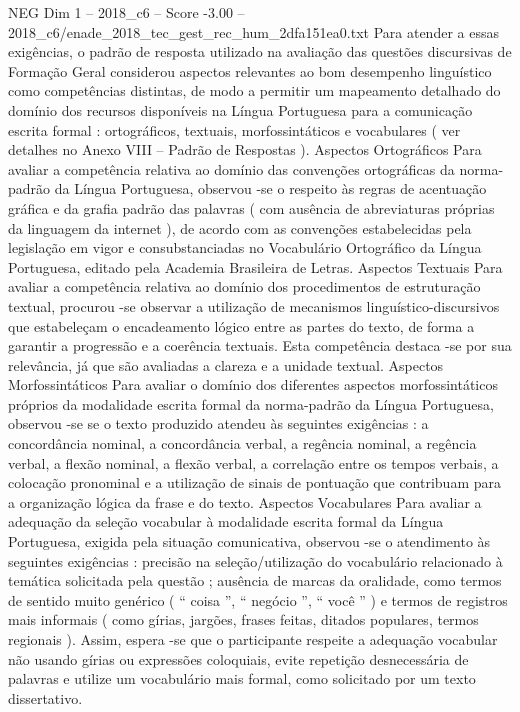 \begin{textsample}{NEG Dim 1 – 2018\_c6 – Score -3.00 – 2018\_c6/enade\_2018\_tec\_gest\_rec\_hum\_2dfa151ea0.txt}
Para atender a essas exigências, o padrão de resposta utilizado na avaliação das questões discursivas de Formação Geral considerou aspectos relevantes ao bom desempenho linguístico como competências distintas, de modo a permitir um mapeamento detalhado do domínio dos recursos disponíveis na Língua Portuguesa para a comunicação escrita formal : ortográficos, textuais, morfossintáticos e vocabulares ( ver detalhes no Anexo VIII – Padrão de Respostas ).
Aspectos Ortográficos Para avaliar a competência relativa ao domínio das convenções ortográficas da norma-padrão da Língua Portuguesa, observou -se o respeito às regras de acentuação gráfica e da grafia padrão das palavras ( com ausência de abreviaturas próprias da linguagem da internet ), de acordo com as convenções estabelecidas pela legislação em vigor e consubstanciadas no Vocabulário Ortográfico da Língua Portuguesa, editado pela Academia Brasileira de Letras.
Aspectos Textuais Para avaliar a competência relativa ao domínio dos procedimentos de estruturação textual, procurou -se observar a utilização de mecanismos linguístico-discursivos que estabeleçam o encadeamento lógico entre as partes do texto, de forma a garantir a progressão e a coerência textuais.
Esta competência destaca -se por sua relevância, já que são avaliadas a clareza e a unidade textual.
Aspectos Morfossintáticos Para avaliar o domínio dos diferentes aspectos morfossintáticos próprios da modalidade escrita formal da norma-padrão da Língua Portuguesa, observou -se se o texto produzido atendeu às seguintes exigências : a concordância nominal, a concordância verbal, a regência nominal, a regência verbal, a flexão nominal, a flexão verbal, a correlação entre os tempos verbais, a colocação pronominal e a utilização de sinais de pontuação que contribuam para a organização lógica da frase e do texto.
Aspectos Vocabulares Para avaliar a adequação da seleção vocabular à modalidade escrita formal da Língua Portuguesa, exigida pela situação comunicativa, observou -se o atendimento às seguintes exigências : precisão na seleção/utilização do vocabulário relacionado à temática solicitada pela questão ; ausência de marcas da oralidade, como termos de sentido muito genérico ( “ coisa ”, “ negócio ”, “ você ” ) e termos de registros mais informais ( como gírias, jargões, frases feitas, ditados populares, termos regionais ).
Assim, espera -se que o participante respeite a adequação vocabular não usando gírias ou expressões coloquiais, evite repetição desnecessária de palavras e utilize um vocabulário mais formal, como solicitado por um texto dissertativo.

\end{textsample}
